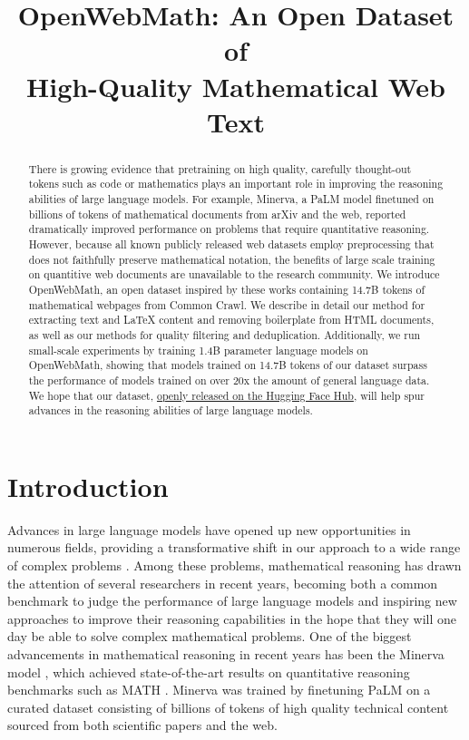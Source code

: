 \title{OpenWebMath: An Open Dataset of \\High-Quality Mathematical Web Text}



\maketitle

\begin{abstract}

There is growing evidence that pretraining on high quality, carefully thought-out tokens such as code or mathematics plays an important role in improving the reasoning abilities of large language models. For example, Minerva, a PaLM model finetuned on billions of tokens of mathematical documents from arXiv and the web, reported dramatically improved performance on problems that require quantitative reasoning. However, because all known publicly released web datasets employ preprocessing that does not faithfully preserve mathematical notation, the benefits of large scale training on quantitive web documents are unavailable to the research community. We introduce OpenWebMath, an open dataset inspired by these works containing 14.7B tokens of mathematical webpages from Common Crawl. We describe in detail our method for extracting text and \LaTeX{} content and removing boilerplate from HTML documents, as well as our methods for quality filtering and deduplication. Additionally, we run small-scale experiments by training 1.4B parameter language models on OpenWebMath, showing that models trained on 14.7B tokens of our dataset surpass the performance of models trained on over 20x the amount of general language data. We hope that our dataset, \href{https://huggingface.co/datasets/open-web-math/open-web-math}{openly released on the Hugging Face Hub}, will help spur advances in the reasoning abilities of large language models.
\end{abstract}

\section{Introduction}
Advances in large language models have opened up new opportunities in numerous fields, providing a transformative shift in our approach to a wide range of complex problems \citep{gpt3, raffel2020exploring}. Among these problems, mathematical reasoning has drawn the attention of several researchers in recent years, becoming both a common benchmark to judge the performance of large language models and inspiring new approaches to improve their reasoning capabilities in the hope that they will one day be able to solve complex mathematical problems. One of the biggest advancements in mathematical reasoning in recent years has been the Minerva model \citep{lewkowycz2022solving}, which achieved state-of-the-art results on quantitative reasoning benchmarks such as MATH \citep{mathdataset}. Minerva was trained by finetuning PaLM \citep{palm} on a curated dataset consisting of billions of tokens of high quality technical content sourced from both scientific papers and the web.


